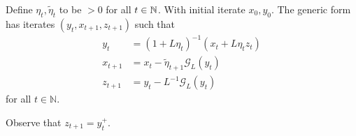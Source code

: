 \documentclass[12pt]{article}
\begin{document}
    \begin{definition}
    \label{def:ag_prox_grad_generic}
        Define $\eta_t, \tilde \eta_t$ to be $> 0$ for all $t \in \mathbb N$. 
        With initial iterate $x_0, y_0$.
        The generic form has iterates $(y_t, x_{t + 1}, z_{t + 1})$ such that 
        $$
        \begin{aligned}
            y_t &= (1 + L\eta_t)^{-1}(x_t + L\eta_t z_t)
            \\
            x_{t + 1} &= x_t - \tilde \eta_{t + 1} \mathcal G_L(y_t)
            \\
            z_{t + 1} &= y_t - L^{-1}\mathcal G_L(y_t)
        \end{aligned}
        $$
        for all $t\in \mathbb N$. 
    \end{definition}
    \begin{remark}
        Observe that $z_{t + 1} = y_t^+$. 
    \end{remark}
    
\end{document}
